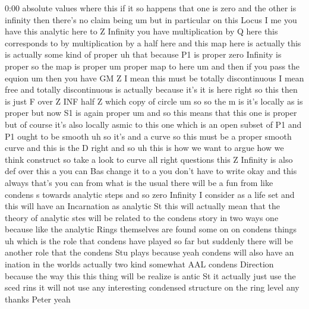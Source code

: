 \begin{unfinished}{0:00}
absolute
values  where  this
if  it  so  happens  that  one  is  zero  and
the  other  is  infinity  then  there's  no
claim  being
um  but  in  particular  on  this  Locus  I  me
you
have  this  analytic
here  to  Z
Infinity  you  have  multiplication  by  Q
here  this  corresponds  to  by
multiplication  by  a  half
here  and  this  map  here  is
actually  this  is  actually  some  kind  of
proper
uh
that
because  P1  is  proper  zero  Infinity  is
proper  so  the  map  is
proper  um  proper  map  to  here  um  and  then
if  you  pass  the
equion  um  then  you
have  GM
Z  I  mean  this  must  be  totally
discontinuous  I  mean  free  and  totally
discontinuous  is  actually  because  it's
it  is  here  right  so  this  then  is  just
F  over  Z
INF  half
Z
which  copy  of
circle
um  so  so  the  m
is  it's  locally  as  is  proper  but  now  S1
is  again
proper
um  and  so  this  means  that  this  one  is
proper  but  of  course  it's  also  locally
asmic  to  this  one  which  is  an  open
subset  of  P1  and  P1  ought  to  be  smooth
uh  so  it's  and  a  curve  so  this  must  be  a
proper  smooth
curve  and  this  is  the  D
right  and  so  uh  this  is  how  we  want  to
argue  how  we  think
construct  so  take  a  look  to
curve  all
right
questions  this  Z  Infinity  is  also  def
over  this
a  you  can  Bas  change  it  to  a  you  don't
have  to  write
okay  and  this  always
that's  you
can
from
what  is  the
usual  there  will  be  a  fun  from  like
condens  s  towards  analytic
steps  and  so  zero  Infinity  I  consider  as
a  life  set  and  this  will  have  an
Incarnation  as  analytic
St  this  will  actually  mean  that  the
theory  of  analytic  stes  will  be  related
to  the  condens  story  in  two
ways  one  because  like  the  analytic  Rings
themselves  are  found  some  on  on  condens
things  uh  which  is  the  role  that  condens
have  played  so  far  but  suddenly  there
will  be  another  role  that  the  condens
Stu  plays  because  yeah  condens  will  also
have  an  ination  in  the  worlds  actually
two  kind  somewhat  AAL  condens
Direction  because  the  way  this  this
thing  will  be  realize  is  antic
St  it  actually  just  use  the  sced  rins  it
will  not  use
any  interesting  condensed  structure  on
the  ring
level
any  thanks  Peter
yeah
\end{unfinished}